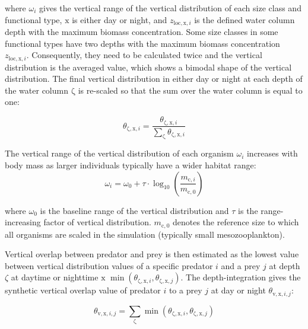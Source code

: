 \documentclass[
]{article}
\begin{document}
where \(\omega_i\) gives the vertical range of the vertical distribution
of each size class and functional type, \(\mathrm{x}\) is either day or
night, and \(z_{\mathrm{loc},\mathrm{x},i}\) is the defined water column
depth with the maximum biomass concentration. Some size classes in some
functional types have two depths with the maximum biomass concentration
\(z_{\mathrm{loc},\mathrm{x},i}\). Consequently, they need to be
calculated twice and the vertical distribution is the averaged value,
which shows a bimodal shape of the vertical distribution. The final
vertical distribution in either day or night at each depth of the water
column \(\mathrm{\zeta}\) is re-scaled so that the sum over the water
column is equal to one:

\begin{equation}
  \theta_{\mathrm{\zeta},\mathrm{x},i} = \frac{\theta_{\mathrm{\zeta},\mathrm{x},i}}{\sum\limits_{\mathrm{\zeta}} \theta_{\mathrm{\zeta},\mathrm{x},i}}
  \label{eq:vertdist2}
\end{equation}

The vertical range of the vertical distribution of each organism
\(\omega_i\) increases with body mass as larger individuals typically
have a wider habitat range: \begin{equation}
  \omega_i = \omega_0 + \tau \cdot \log_{10}\left(\frac{m_{\mathrm{c},i}}{m_{\mathrm{c},0}}\right)
\end{equation}

where \(\omega_0\) is the baseline range of the vertical distribution
and \(\tau\) is the range-increasing factor of vertical distribution.
\(m_{\mathrm{c},0}\) denotes the reference size to which all organisms
are scaled in the simulation (typically small mesozooplankton).

Vertical overlap between predator and prey is then estimated as the
lowest value between vertical distribution values of a specific predator
\(i\) and a prey \(j\) at depth \(\zeta\) at daytime or nighttime
\(\mathrm{x}\)
\(\min(\theta_{\mathrm{\zeta},\mathrm{x},i}, \theta_{\mathrm{\zeta},\mathrm{x},j})\).
The depth-integration gives the synthetic vertical overlap value of
predator \(i\) to a prey \(j\) at day or night
\(\theta_{\mathrm{v},\mathrm{x},i,j}\):

\begin{equation}
  \theta_{\mathrm{v},\mathrm{x},i,j} = \sum\limits_{\mathrm{\zeta}}\min(\theta_{\mathrm{\zeta},\mathrm{x},i},\theta_{\mathrm{\zeta},\mathrm{x},j})
\end{equation}
\end{document}
